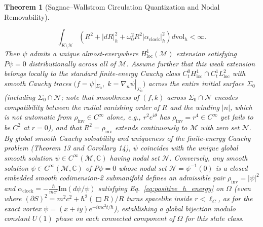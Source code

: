 \documentclass[11pt, a4paper]{article}
\newtheorem{theorem}{Theorem}[section]
\theoremstyle{definition}
\begin{document}
\begin{theorem}[Sagnac--Wallstrom Circulation Quantization and Nodal Removability]
\begin{enumerate}[label=(\alph*)]
    \begin{equation}
    \label{eq:positive_h_energy}
    \int_{K \setminus \mathcal{N}} \left( R^2 + |dR|_h^2 + \omega_0^2 R^2 |\alpha_{\text{clock}}|_h^2 \right) d\mathrm{vol}_h < \infty.
    \end{equation}
    Then $\psi$ admits a unique almost-everywhere $H^1_{\text{loc}}(\mathcal{M})$ extension satisfying $P\psi = 0$ distributionally across all of $\mathcal{M}$. Assume further that this weak extension belongs locally to the standard finite-energy Cauchy class $C^0_t H^1_{\text{loc}} \cap C^1_t L^2_{\text{loc}}$ with smooth Cauchy traces $\big(f = \psi|_{\Sigma_0},\; k = \nabla_n \psi|_{\Sigma_0}\big)$ across the entire initial surface $\Sigma_0$ (including $\Sigma_0 \cap \mathcal{N}$; note that smoothness of $(f, k)$ across $\Sigma_0 \cap \mathcal{N}$ encodes compatibility between the radial vanishing order of $R$ and the winding $|n|$, which is not automatic from $\rho_{\text{inv}} \in C^\infty$ alone, e.g., $r^2 e^{i\theta}$ has $\rho_{\text{inv}} = r^4 \in C^\infty$ yet fails to be $C^2$ at $r = 0$), and that $R^2 = \rho_{\text{inv}}$ extends continuously to $\mathcal{M}$ with zero set $\mathcal{N}$. By global smooth Cauchy solvability \cite{BarGinouxPfaffle2007} and uniqueness of the finite-energy Cauchy problem \cite{Bar2015} (Theorem 13 and Corollary 14), $\psi$ coincides with the unique global smooth solution $\psi \in C^\infty(\mathcal{M}, \mathbb{C})$ having nodal set $\mathcal{N}$. Conversely, any smooth solution $\psi \in C^\infty(\mathcal{M}, \mathbb{C})$ of $P\psi = 0$ whose nodal set $\mathcal{N} = \psi^{-1}(0)$ is a closed embedded smooth codimension-2 submanifold defines an admissible pair $\rho_{\text{inv}} = |\psi|^2$ and $\alpha_{\text{clock}} = -\frac{\hbar}{mc^2}\text{Im}(d\psi/\psi)$ satisfying Eq.~\eqref{eq:positive_h_energy} on $\Omega$ (even where $(\partial S)^2 = m^2 c^2 + \hbar^2(\Box R)/R$ turns spacelike inside $r < \ell_C$, as for the exact vortex $\psi = (x+iy)e^{-imc^2 t/\hbar}$), establishing a global bijection modulo constant $U(1)$ phase on each connected component of $\Omega$ for this state class.
\end{enumerate}
\end{theorem}
\end{document}
